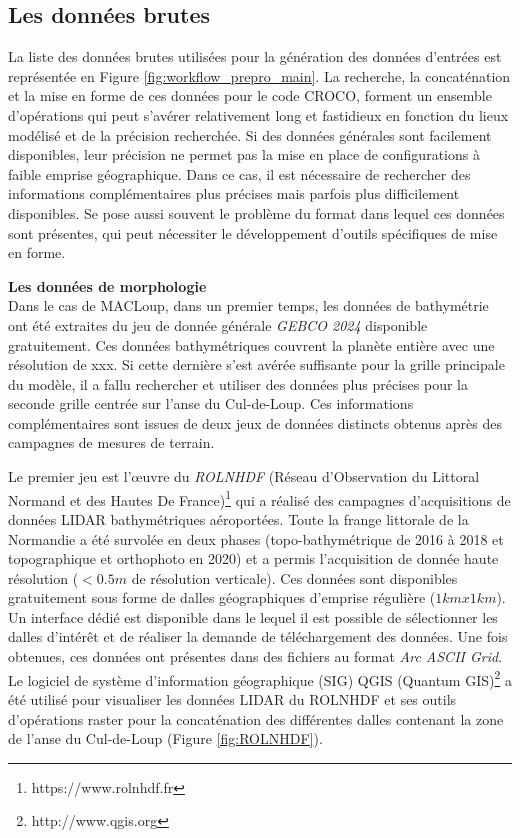 \documentclass[10pt,a4paper,titlepage]{article}
\begin{document}
\subsection{Les données brutes}

La liste des données brutes utilisées pour la génération des données d'entrées est représentée en Figure \ref{fig:workflow_prepro_main}. La recherche, la concaténation et la mise en forme de ces données pour le code CROCO, forment un ensemble d'opérations qui peut s'avérer relativement long et fastidieux en fonction du lieux modélisé et de la précision recherchée. Si des données générales sont facilement disponibles, leur précision ne permet pas la mise en place de configurations à faible emprise géographique. Dans ce cas, il est nécessaire de rechercher des informations complémentaires plus précises mais parfois plus difficilement disponibles. Se pose aussi souvent le problème du format dans lequel ces données sont présentes, qui peut nécessiter le développement d'outils spécifiques de mise en forme.

\textbf{Les données de morphologie}\\
Dans le cas de MACLoup, dans un premier temps, les données de bathymétrie ont été extraites du jeu de donnée générale \textit{GEBCO 2024} disponible gratuitement. Ces données bathymétriques couvrent la planète entière avec une résolution de \alert{xxx}. Si cette dernière s'est avérée suffisante pour la grille principale du modèle, il a fallu rechercher et utiliser des données plus précises pour la seconde grille centrée sur l'anse du Cul-de-Loup. Ces informations complémentaires sont issues de deux jeux de données distincts obtenus après des campagnes de mesures de terrain.

Le premier jeu est l'\oe{}uvre du \textit{ROLNHDF} (Réseau d'Observation du Littoral Normand et des Hautes De France)\footnote{https://www.rolnhdf.fr} qui a réalisé des campagnes d'acquisitions de données LIDAR bathymétriques aéroportées. Toute la frange littorale de la Normandie a été survolée en deux phases (topo-bathymétrique de 2016 à 2018 et topographique et orthophoto en 2020) et a permis l'acquisition de donnée haute résolution ($<0.5 m$ de résolution verticale). Ces données sont disponibles gratuitement sous forme de dalles géographiques d'emprise régulière ($1 km x 1 km$). Un interface dédié est disponible dans le lequel il est possible de sélectionner les dalles d'intérêt et de réaliser la demande de téléchargement des données. Une fois obtenues, ces données ont présentes dans des fichiers au format \textit{Arc ASCII Grid}. Le logiciel de système d'information géographique (SIG) QGIS (Quantum GIS)\footnote{http://www.qgis.org} a été utilisé pour visualiser les données LIDAR du ROLNHDF et ses outils d'opérations raster pour la concaténation des différentes dalles contenant la zone de l'anse du Cul-de-Loup (Figure \ref{fig:ROLNHDF}).
\end{document}
